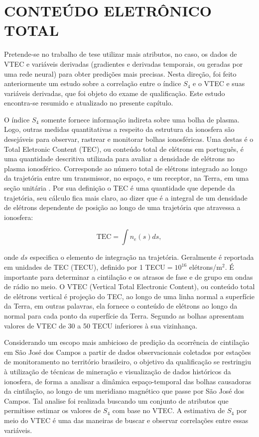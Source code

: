 \chapter{CONTEÚDO ELETRÔNICO TOTAL}\label{ch:tec}

Pretende-se no trabalho de tese utilizar mais atributos, no caso, os dados de VTEC e variáveis derivadas (gradientes e derivadas temporais, ou geradas por uma rede neural) para obter predições mais precisas. Nesta direção, foi feito anteriormente um estudo sobre a correlação entre o índice $S_4$ e o VTEC e suas variáveis derivadas, que foi objeto do exame de qualificação. Este estudo encontra-se resumido e atualizado no presente capítulo.

O índice $S_4$ somente fornece informação indireta sobre uma bolha de plasma. Logo, outras medidas quantitativas a respeito da estrutura da ionosfera são desejáveis para observar, rastrear e monitorar bolhas ionosféricas. Uma destas é o Total Eletronic Content (TEC), ou conteúdo total de elétrons em português, é uma quantidade descritiva utilizada para avaliar a densidade de elétrons no plasma ionosférico. Corresponde ao número total de elétrons integrado ao longo da trajetória entre um transmissor, no espaço, e um receptor, na Terra, em uma seção unitária \cite{HOFMANN:2013}. Por sua definição o TEC é uma quantidade que depende da trajetória, seu cálculo fica mais claro, ao dizer que é a integral de um densidade de elétrons dependente de posição ao longo de uma trajetória que atravessa a ionosfera:

\begin{equation}
    \mbox{TEC}=\int{n_{e}(s)}ds\mbox{,}~
\end{equation}

onde $ds$ especifica o elemento de integração na trajetória. Geralmente é reportada em unidades de TEC (TECU), definido por 1 TECU$=10^{16}$ elétrons/m$^2$. É importante para determinar a cintilação e os atrasos de fase e de grupo em ondas de rádio no meio. O VTEC (Vertical Total Electronic Content), ou conteúdo total de elétrons vertical é projeção do TEC, ao longo de uma linha normal a superfície da Terra, em outras palavras, ela fornece o conteúdo de elétrons ao longo da normal para cada ponto da superfície da Terra. Segundo \cite{TAKAHASHI:2006} as bolhas apresentam valores de VTEC de 30 a 50 TECU inferiores à sua vizinhança.

Considerando um escopo mais ambicioso de predição da ocorrência de cintilação em São José dos Campos a partir de dados observacionais coletados por estações de monitoramento no território brasileiro, o objetivo da qualificação se restringiu à utilização de técnicas de mineração e visualização de dados históricos da ionosfera, de forma a analisar a dinâmica espaço-temporal das bolhas causadoras da cintilação, ao longo de um meridiano magnético que passe por São José dos Campos. Tal analise foi realizada buscando um conjunto de atributos que permitisse estimar os valores de $S_4$ com base no VTEC. A estimativa de $S_4$ por meio do VTEC é uma das maneiras de buscar e observar correlações entre essas variáveis.

